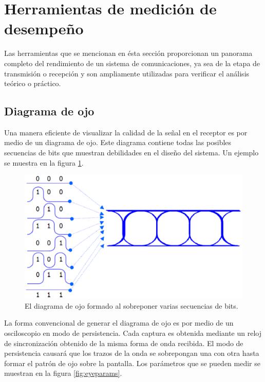 
\section{Herramientas de medici\'on de desempe\~no}
Las herramientas que se mencionan en \'esta secci\'on proporcionan un panorama completo del
rendimiento de un sistema de comunicaciones, ya sea de la etapa de transmisi\'on o recepci\'on y
son ampliamente utilizadas para verificar el an\'alisis te\'orico o pr\'actico.

\subsection{Diagrama de ojo}
Una manera eficiente de visualizar la calidad de la se\~nal en el receptor es por medio de un diagrama
de ojo. Este diagrama contiene todas las posibles secuencias de bits que muestran debilidades en el
dise\~no del sistema. Un ejemplo se muestra en la figura \ref{fig:eyeform}\cite{foster}.

\begin{figure}[htp]
\centering
	\includegraphics[width=5.5in]{figs/eyeform}
	\caption{El diagrama de ojo formado al sobreponer varias secuencias de bits.}
	\label{fig:eyeform}
\end{figure}

La forma convencional de generar el diagrama de ojo es por medio de un osciloscopio en modo de
persistencia. Cada captura es obtenida mediante un reloj de sincronizaci\'on obtenido de la misma
forma de onda recibida. El modo de persistencia causar\'a que los trazos de la onda se sobrepongan
una con otra hasta formar el patr\'on de ojo sobre la pantalla. Los par\'ametros que se pueden
medir se muestran en la figura \ref{fig:eyeparams}\cite{breed}.


